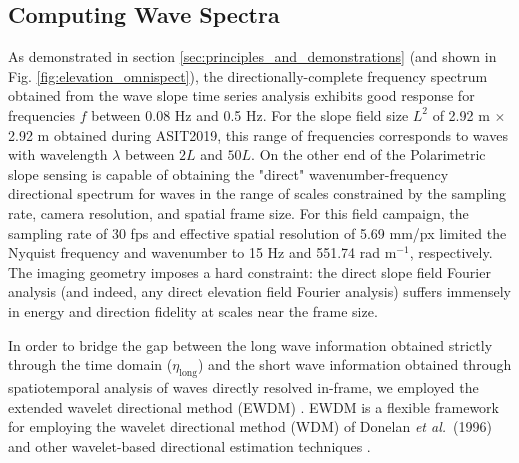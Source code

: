 \documentclass[letterpaper,draftcls,onecolumn]{IEEEtran}
\newcommand{\etalong}{\eta_{\mathrm{long}}}
\newcommand{\etal}{\emph{et al.}}
\begin{document}
\subsection{Computing Wave Spectra}
\label{sec:wave_spectra}

As demonstrated in section \ref{sec:principles_and_demonstrations} (and shown in Fig. \ref{fig:elevation_omnispect}), the directionally-complete frequency spectrum obtained from the wave slope time series analysis exhibits good response for frequencies $f$ between 0.08 Hz and 0.5 Hz. For the slope field size $L^2$ of 2.92 m $\times$ 2.92 m obtained during ASIT2019, this range of frequencies corresponds to waves with wavelength $\lambda$ between $2L$ and $50L$. On the other end of the Polarimetric slope sensing is capable of obtaining the "direct" wavenumber-frequency directional spectrum for waves in the range of scales constrained by the sampling rate, camera resolution, and spatial frame size. For this field campaign, the sampling rate of 30 fps and effective spatial resolution of 5.69 mm/px limited the Nyquist frequency and wavenumber to 15 Hz and 551.74 rad m$^{-1}$, respectively. The imaging geometry imposes a hard constraint: the direct slope field Fourier analysis (and indeed, any direct elevation field Fourier analysis) suffers immensely in energy and direction fidelity at scales near the frame size.

In order to bridge the gap between the long wave information obtained strictly through the time domain ($\etalong$) and the short wave information obtained through spatiotemporal analysis of waves directly resolved in-frame, we employed the extended wavelet directional method (EWDM) \cite{pelaez-zapata_ewdm_2025}. EWDM is a flexible framework for employing the wavelet directional method (WDM) of Donelan \etal~(1996) \cite{donelan_nonstationary_1996} and other wavelet-based directional estimation techniques \cite{krogstad_magnusson_donelan_2006,pelaez-zapata_ocean_2024}.
\end{document}
